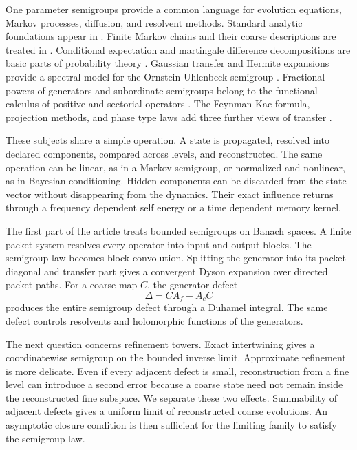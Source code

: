 \documentclass[11pt,letterpaper]{article}
\theoremstyle{plain}
\theoremstyle{plain}
\theoremstyle{plain}
\theoremstyle{definition}
\theoremstyle{definition}
\theoremstyle{definition}
\theoremstyle{definition}
\theoremstyle{definition}
\theoremstyle{remark}
\theoremstyle{remark}
\theoremstyle{remark}
\theoremstyle{remark}
\theoremstyle{remark}
\theoremstyle{remark}
\begin{document}
One parameter semigroups provide a common language for evolution equations, Markov processes, diffusion, and resolvent methods. Standard analytic foundations appear in \cite{Pazy1983,EngelNagel2000}. Finite Markov chains and their coarse descriptions are treated in \cite{KemenySnell1960,Norris1997,RogersPitman1981}. Conditional expectation and martingale difference decompositions are basic parts of probability theory \cite{Williams1991}. Gaussian transfer and Hermite expansions provide a spectral model for the Ornstein Uhlenbeck semigroup \cite{Janson1997}. Fractional powers of generators and subordinate semigroups belong to the functional calculus of positive and sectorial operators \cite{Balakrishnan1960,SchillingSongVondracek2012}. The Feynman Kac formula, projection methods, and phase type laws add three further views of transfer \cite{Kac1949,Feshbach1958,Zwanzig1961,Neuts1981}.

These subjects share a simple operation. A state is propagated, resolved into declared components, compared across levels, and reconstructed. The same operation can be linear, as in a Markov semigroup, or normalized and nonlinear, as in Bayesian conditioning. Hidden components can be discarded from the state vector without disappearing from the dynamics. Their exact influence returns through a frequency dependent self energy or a time dependent memory kernel.

The first part of the article treats bounded semigroups on Banach spaces. A finite packet system resolves every operator into input and output blocks. The semigroup law becomes block convolution. Splitting the generator into its packet diagonal and transfer part gives a convergent Dyson expansion over directed packet paths. For a coarse map \(C\), the generator defect
\[
\Delta=CA_f-A_cC
\]
produces the entire semigroup defect through a Duhamel integral. The same defect controls resolvents and holomorphic functions of the generators.

The next question concerns refinement towers. Exact intertwining gives a coordinatewise semigroup on the bounded inverse limit. Approximate refinement is more delicate. Even if every adjacent defect is small, reconstruction from a fine level can introduce a second error because a coarse state need not remain inside the reconstructed fine subspace. We separate these two effects. Summability of adjacent defects gives a uniform limit of reconstructed coarse evolutions. An asymptotic closure condition is then sufficient for the limiting family to satisfy the semigroup law.
\end{document}
